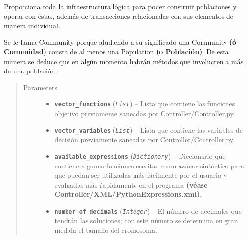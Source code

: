 \documentclass[letterpaper,10pt,english]{sphinxmanual}
\begin{document}
\begin{fulllineitems}
\label{Model/Community/Community:Model.Community.Community.Community}~
\begin{DUlineblock}{0em}
\item[] Proporciona toda la infraestructura lógica para poder construir poblaciones y operar con éstas,
además de transacciones relacionadas con sus elementos de manera individual.
\item[] Se le llama Community porque aludiendo a su significado una Community \textbf{(ó Comunidad)}
consta de al menos una Population \textbf{(o Población)}. De esta manera se deduce que en algún momento
habrán métodos que involucren a más de una población.
\end{DUlineblock}
\begin{quote}\begin{description}
\item[{Parameters}] \leavevmode\begin{itemize}
\item {} 
\textbf{\texttt{vector\_functions}} (\emph{\texttt{List}}) -- Lista que contiene las funciones objetivo previamente 
saneadas por Controller/Controller.py.

\item {} 
\textbf{\texttt{vector\_variables}} (\emph{\texttt{List}}) -- Lista que contiene las variables de decisión previamente 
saneadas por Controller/Controller.py.

\item {} 
\textbf{\texttt{available\_expressions}} (\emph{\texttt{Dictionary}}) -- Diccionario que contiene algunas funciones escritas como azúcar sintáctica
para que puedan ser utilizadas más fácilmente por el usuario y evaluadas
más ŕapidamente en el programa \textbf{(véase Controller/XML/PythonExpressions.xml)}.

\item {} 
\textbf{\texttt{number\_of\_decimals}} (\emph{\texttt{Integer}}) -- El número de decimales que tendrán las soluciones; con este número se determina
en gran medida el tamaño del cromosoma.


\end{itemize}
\end{description}
\end{quote}
\end{fulllineitems}
\end{document}
